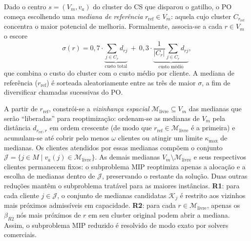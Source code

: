 \documentclass[a4paper,11pt]{article}
\begin{document}
Dado o centro $s = (V_m, v_a)$ do cluster do CS que disparou o gatilho, o PO começa escolhendo uma \emph{mediana de referência} $r_{\mathrm{ref}} \in V_m$: aquela cujo cluster $C_{r_{\mathrm{ref}}}$ concentra o maior potencial de melhoria. Formalmente, associa-se a cada $r \in V_m$ o escore
\begin{equation}
\sigma(r) = 0{,}7 \cdot \underbrace{\sum_{j \in C_r} d_{rj}}_{\text{custo total}}\ +\ 0{,}3 \cdot \underbrace{\frac{1}{|C_r|} \sum_{j \in C_r} d_{rj}}_{\text{custo médio}},
\label{eq:po_score}
\end{equation}
que combina o custo do cluster com o custo médio por cliente. A mediana de referência ($r_{\mathrm{ref}}$) é sorteada aleatoriamente entre as três de maior $\sigma$, a fim de diversificar chamadas sucessivas do PO.

A partir de $r_{\mathrm{ref}}$, constrói-se a \emph{vizinhança espacial} $\mathcal{M}_{\mathrm{livre}} \subseteq V_m$ das medianas que serão ``liberadas'' para reoptimização: ordenam-se as medianas de $V_m$ pela distância $d_{r_{\mathrm{ref}}, r}$ em ordem crescente (de modo que $r_{\mathrm{ref}} \in \mathcal{M}_{\mathrm{livre}}$ é a primeira) e acumulam-se até cobrir pelo menos $\omega$ clientes ou atingir um limite $\kappa_{\max}$ de medianas. Os clientes atendidos por essas medianas compõem o conjunto $\mathcal{J} = \{ j \in M \mid v_a(j) \in \mathcal{M}_{\mathrm{livre}} \}$. As demais medianas $V_m \setminus \mathcal{M}_{\mathrm{livre}}$ e seus respectivos clientes permanecem fixos: o subproblema MIP reoptimiza apenas a alocação e a escolha de medianas dentro de $\mathcal{J}$, preservando o restante da solução. Duas outras reduções mantêm o subproblema tratável para as maiores instâncias. \textbf{R1}: para cada cliente $j \in \mathcal{J}$, o conjunto de medianas candidatas $\mathcal{K}_j$ é restrito aos vizinhos mais próximos admissíveis em capacidade. \textbf{R2}: para cada $r \in \mathcal{M}_{\mathrm{livre}}$, apenas os $\beta_{R2}$ nós mais próximos de $r$ em seu cluster original podem abrir a mediana.  Assim, o subproblema MIP reduzido é resolvido de modo exato por solvers comerciais. 
\end{document}
